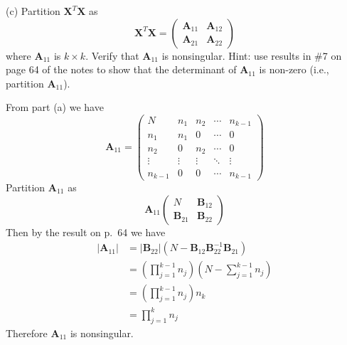 \bigskip
\noindent
(c) Partition $\mathbf X^T\mathbf X$ as
$$\mathbf X^T\mathbf X=\begin{pmatrix}
\mathbf A_{11} & \mathbf A_{12}\\
\mathbf A_{21} & \mathbf A_{22}
\end{pmatrix}
$$
where $\mathbf A_{11}$ is $k\times k$.
Verify that $\mathbf A_{11}$ is nonsingular.
Hint: use results in \#7 on page 64 of the notes to
show that the determinant of $\mathbf A_{11}$ is non-zero
(i.e., partition $\mathbf A_{11}$).

\bigskip
\noindent
From part (a) we have
\begin{equation*}
\mathbf A_{11}=\begin{pmatrix}
N & n_1 & n_2 & \cdots & n_{k-1}\\
n_1 & n_1 & 0 & \cdots & 0\\
n_2 & 0 & n_2 & \cdots & 0\\
\vdots & \vdots & \vdots & \ddots & \vdots\\
n_{k-1} & 0 & 0 & \cdots & n_{k-1}
\end{pmatrix}
\end{equation*}
Partition $\mathbf A_{11}$ as
\begin{equation*}
\mathbf A_{11}
\begin{pmatrix}
N & \mathbf B_{12}\\
\mathbf B_{21} & \mathbf B_{22}
\end{pmatrix}
\end{equation*}
Then by the result on p.\ 64 we have
\begin{align*}
|\mathbf A_{11}|
&=|\mathbf B_{22}|
\left(N-\mathbf B_{12}\mathbf B_{22}^{-1}\mathbf B_{21}\right)\\
&=\left(\prod_{j=1}^{k-1}n_j\right)
\left(N-\sum_{j=1}^{k-1}n_j\right)\\
&=\left(\prod_{j=1}^{k-1}n_j\right)n_k\\
&=\prod_{j=1}^kn_j
\end{align*}
Therefore $\mathbf A_{11}$ is nonsingular.

